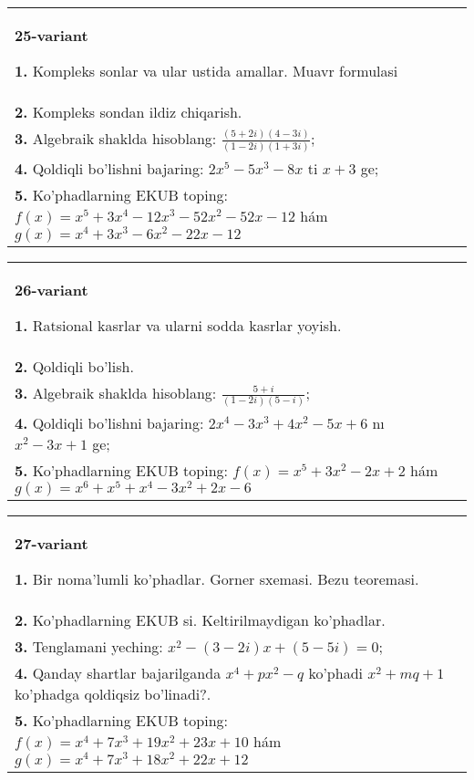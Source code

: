 \documentclass{article}
\begin{document}
\begin{tabular}{m{17cm}}
\textbf{25-variant}
\newline

\textbf{1.} Kompleks sonlar va ular ustida amallar. Muavr formulasi  \\
\textbf{2.} Kompleks sondan ildiz chiqarish. \\
\textbf{3.} Algebraik shaklda hisoblang: $\frac{(5+2 i)(4-3 i)}{(1-2 i)(1+3 i)}$; \\
\textbf{4.} Qoldiqli bo’lishni bajaring: $2 x^5-5 x^3-8 x$ ti $x+3$ ge; \\
\textbf{5.} Ko’phadlarning EKUB toping:  $f(x)=x^5+3 x^4-12 x^3-52 x^2-52 x-12$ hám $g(x)=x^4+3 x^3-6 x^2-22 x-12$ \\

\end{tabular}
\vspace{1cm}


\begin{tabular}{m{17cm}}
\textbf{26-variant}
\newline

\textbf{1.} Ratsional kasrlar va ularni sodda kasrlar yoyish. \\
\textbf{2.} Qoldiqli bo’lish.  \\
\textbf{3.} Algebraik shaklda hisoblang: $\frac{5+i}{(1-2 i)(5-i)}$; \\
\textbf{4.} Qoldiqli bo’lishni bajaring: $2 x^4-3 x^3+4 x^2-5 x+6$ nı $x^2-3 x+1$ ge; \\
\textbf{5.} Ko’phadlarning EKUB toping:  $f(x)=x^5+3 x^2-2 x+2$ hám $g(x)=x^6+x^5+x^4-3 x^2+2 x-6$ \\

\end{tabular}
\vspace{1cm}


\begin{tabular}{m{17cm}}
\textbf{27-variant}
\newline

\textbf{1.} Bir noma’lumli ko’phadlar. Gorner sxemasi. Bezu teoremasi.  \\
\textbf{2.} Ko’phadlarning EKUB si. Keltirilmaydigan ko’phadlar. \\
\textbf{3.} Tenglamani yeching:  $x^2-(3-2 i) x+(5-5 i)=0$; \\
\textbf{4.} Qanday shartlar bajarilganda $x^4+p x^2-q$ ko’phadi $x^2+m q+1$ ko’phadga qoldiqsiz bo’linadi?. \\
\textbf{5.} Ko’phadlarning EKUB toping:  $f(x)=x^4+7 x^3+19 x^2+23 x+10$ hám $g(x)=x^4+7 x^3+18 x^2+22 x+12$ \\

\end{tabular}
\vspace{1cm}
\end{document}
